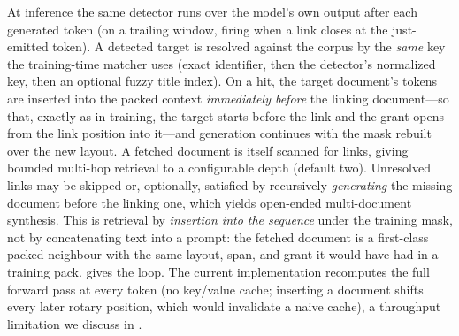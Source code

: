 At inference the same detector runs over the model's own output after each generated
token (on a trailing window, firing when a link closes at the just-emitted token). A
detected target is resolved against the corpus by the \emph{same} key the training-time
matcher uses (exact identifier, then the detector's normalized key, then an optional
fuzzy title index). On a hit, the target document's tokens are inserted into the packed
context \emph{immediately before} the linking document---so that, exactly as in
training, the target starts before the link and the \crossdoc grant opens from the link
position into it---and generation continues with the mask rebuilt over the new layout.
A fetched document is itself scanned for links, giving bounded multi-hop retrieval to a
configurable depth (default two). Unresolved links may be skipped or, optionally,
satisfied by recursively \emph{generating} the missing document before the linking one,
which yields open-ended multi-document synthesis. This is retrieval by
\emph{insertion into the sequence} under the training mask, not by concatenating text
into a prompt: the fetched document is a first-class packed neighbour with the same
layout, span, and grant it would have had in a training pack. 
gives the loop. The current implementation recomputes the full forward pass at every
token (no key/value cache; inserting a document shifts every later rotary position,
which would invalidate a naive cache), a throughput limitation we discuss in
.

